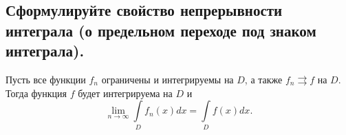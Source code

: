 \subsection{Сформулируйте свойство непрерывности интеграла (о предельном переходе под знаком интеграла).}

\begin{theorem*}
    Пусть все функции $f_n$ ограничены и интегрируемы на $D$, а также $f_n \rightrightarrows f$ на $D$. Тогда функция $f$ будет интегрируема на $D$ и
    \begin{equation*}
        \lim_{n \to \infty} \underset{D}{\int} f_n(x) dx = \underset{D}{\int} f(x) dx.
    \end{equation*}
\end{theorem*}